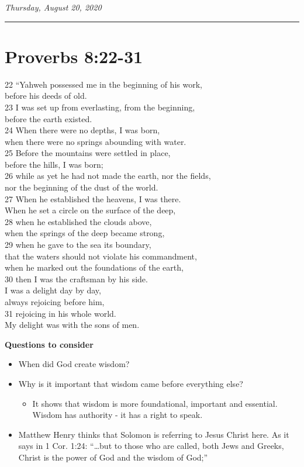 \documentclass[
]{book}
\providecommand{\tightlist}{%
  \setlength{\itemsep}{0pt}\setlength{\parskip}{0pt}}
\begin{document}
\emph{Thursday, August 20, 2020}

\begin{center}\rule{0.5\linewidth}{0.5pt}\end{center}

\hypertarget{proverbs-822-31}{%
\section{Proverbs 8:22-31}\label{proverbs-822-31}}

22 ``Yahweh possessed me in the beginning of his work,\\
before his deeds of old.\\
23 I was set up from everlasting, from the beginning,\\
before the earth existed.\\
24 When there were no depths, I was born,\\
when there were no springs abounding with water.\\
25 Before the mountains were settled in place,\\
before the hills, I was born;\\
26 while as yet he had not made the earth, nor the fields,\\
nor the beginning of the dust of the world.\\
27 When he established the heavens, I was there.\\
When he set a circle on the surface of the deep,\\
28 when he established the clouds above,\\
when the springs of the deep became strong,\\
29 when he gave to the sea its boundary,\\
that the waters should not violate his commandment,\\
when he marked out the foundations of the earth,\\
30 then I was the craftsman by his side.\\
I was a delight day by day,\\
always rejoicing before him,\\
31 rejoicing in his whole world.\\
My delight was with the sons of men.

\textbf{Questions to consider}

\begin{itemize}
\tightlist
\item
  When did God create wisdom?
\item
  Why is it important that wisdom came before everything else?

  \begin{itemize}
  \tightlist
  \item
    It shows that wisdom is more foundational, important and essential. Wisdom has authority - it has a right to speak.
  \end{itemize}
\item
  Matthew Henry thinks that Solomon is referring to Jesus Christ here. As it says in 1 Cor. 1:24: ``\ldots but to those who are called, both Jews and Greeks, Christ is the power of God and the wisdom of God;''
\end{itemize}
\end{document}
